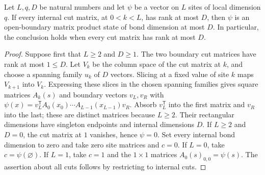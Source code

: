 \begin{lemma}
    \label{thm:chain_mps_of_cut_rank}
    \leanok
    Let $L,q,D$ be natural numbers and let $\psi$ be a vector on $L$ sites
    of local dimension $q$. If every internal cut matrix, at $0<k<L$, has
    rank at most $D$, then $\psi$ is an open-boundary matrix product state
    of bond dimension at most $D$. In particular, the conclusion holds
    when every cut matrix has rank at most $D$.
\end{lemma}
\begin{proof}
    \leanok
    Suppose first that $L\geq2$ and $D\geq1$. The two boundary cut matrices
    have rank at most $1\leq D$. Let $V_k$ be the column space of the cut
    matrix at $k$, and choose a spanning family $u_k$ of $D$ vectors.
    Slicing at a fixed value of site $k$ maps $V_{k+1}$ into $V_k$.
    Expressing these slices in the chosen spanning families gives square
    matrices $A_k(s)$ and boundary vectors $v_L,v_R$ with
    $\psi(x)=v_L^{\mathsf T}A_0(x_0)\cdots A_{L-1}(x_{L-1})v_R$.
    Absorb $v_L^{\mathsf T}$ into the first matrix and $v_R$ into the last;
    these are distinct matrices because $L\geq2$. Their rectangular
    dimensions have singleton endpoints and internal dimensions $D$.
    If $L\geq2$ and $D=0$, the cut matrix at $1$ vanishes, hence $\psi=0$.
    Set every internal bond dimension to zero and take zero site matrices
    and $c=0$. If $L=0$, take $c=\psi(\varnothing)$. If $L=1$, take
    $c=1$ and the $1\times1$ matrices $A_0(s)_{0,0}=\psi(s)$.
    The assertion about all cuts follows by restricting to internal cuts.
\end{proof}

